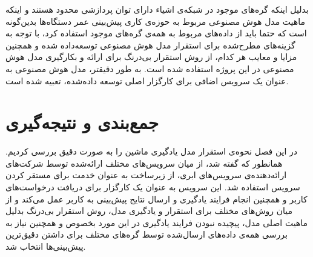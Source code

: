 بدلیل اینکه گره‌های موجود در شبکه‌ی اشیاء دارای توان پردازشی محدود هستند و اینکه ماهیت مدل هوش‌ مصنوعی مربوط به حوزه‌ی کاری پیش‌بینی عمر دستگاه‌ها بدین‌گونه است که حتما باید از داده‌های مربوط به همه‌ی گره‌های موجود استفاده کرد، با توجه به گزینه‌های مطرح‌شده برای استقرار مدل هوش مصنوعی توسعه‌داده شده و همچنین مزایا و معایب هر کدام، از روش استقرار بی‌درنگ برای ارائه و بکارگیری مدل هوش مصنوعی در این پروژه استفاده شده است. به طور دقیقتر، مدل هوش مصنوعی به عنوان یک سرویس اضافی برای کارگزار اصلی توسعه‌ داده‌شده، تعبیه شده است. 

\section{جمع‌بندی و نتیجه‌گیری}
در این فصل نحوه‌ی استقرار مدل یادگیری ماشین را به صورت دقیق بررسی کردیم. همانطور که گفته شد، از میان سرویس‌های مختلف ارائه‌شده توسط شرکت‌های ارائه‌دهنده‌ی سرویس‌های ابری، از زیرساخت به عنوان خدمت برای مستقر کردن سرویس استفاده‌ شد. این سرویس به عنوان یک کارگزار برای دریافت درخواست‌های کاربر و همچنین انجام فرایند یادگیری و ارسال نتایج پیش‌بینی به کاربر عمل می‌کند و از میان روش‌های مختلف برای استقرار و یادگیری مدل، روش استقرار بی‌درنگ بدلیل ماهیت اصلی مدل، پیچیده نبودن فرایند یادگیری در این مورد بخصوص و همچنین نیاز به بررسی همه‌ی داده‌های ارسال‌شده توسط گره‌های مختلف برای داشتن دقیق‌ترین پیش‌بینی‌ها انتخاب شد.